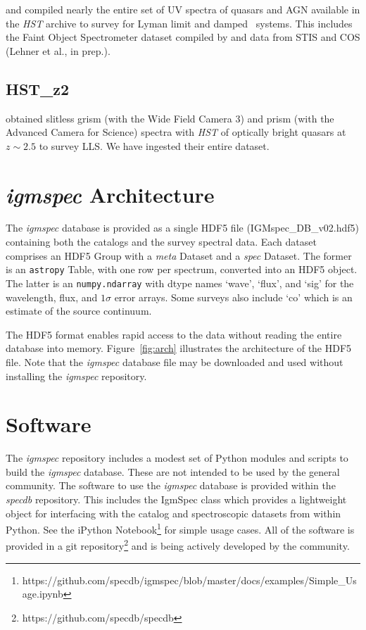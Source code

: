 \documentclass[12pt]{elsarticle}
\begin{document}
\cite{ribaudo11} and \cite{neeleman+16}
compiled nearly the entire set of UV spectra of 
quasars and AGN available in the {\it HST} archive
to survey for Lyman limit and damped \lya\ systems.
This includes the Faint Object Spectrometer dataset
compiled by \cite{bechtold02} and data from STIS
and COS (Lehner et al., in prep.).

\subsection{HST\_z2}
\label{sec:hstz2}

\cite{omeara11,omeara13} obtained slitless grism
(with the Wide Field Camera 3) and prism (with the
Advanced Camera for Science) spectra with {\it HST}
of optically bright quasars at $z \sim 2.5$
to survey LLS.  We have ingested their entire dataset.

\section{{\it igmspec} Architecture}
\label{sec:arch}

The {\it igmspec} database is provided as a single HDF5 file
(IGMspec\_DB\_v02.hdf5)
containing both the catalogs and the survey spectral data.  
Each dataset comprises an HDF5 Group
with a {\it meta} Dataset and a {\it spec} Dataset.
The former is an {\tt astropy} Table, with one row per
spectrum, converted into an HDF5 object.
The latter is an {\tt numpy.ndarray} 
with dtype names `wave', `flux', and `sig' for the
wavelength, flux, and $1\sigma$ error arrays.
Some surveys also include `co' which is an estimate of the source
continuum.  

The HDF5 format enables rapid access to the data without
reading the entire database into memory.  
Figure~\ref{fig:arch} illustrates the 
architecture of the HDF5 file.
Note that the {\it igmspec} database file may be
downloaded and used without installing the {\it igmspec}
repository.


\section{Software}
\label{sec:software}

The {\it igmspec} repository includes 
a modest set of Python modules and scripts to build the
{\it igmspec} database.  
These are not intended to be used by the general community.
The software to use the {\it igmspec}
database is provided within the {\it specdb} repository.
This includes the
IgmSpec class which provides a lightweight object for
interfacing with the catalog and spectroscopic datasets
from within Python.  See the iPython Notebook\footnote{
https://github.com/specdb/igmspec/blob/master/docs/examples/Simple\_Usage.ipynb}
for simple usage cases.
All of the software is provided in a git repository\footnote{
https://github.com/specdb/specdb}
and is being actively developed by the community.
\end{document}
